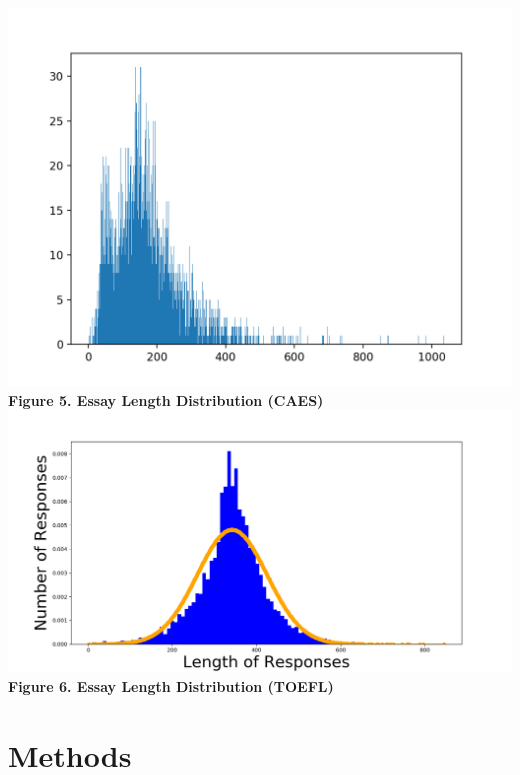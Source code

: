 \documentclass[12pt]{article}
\begin{document}
 \begin{center}
 	\includegraphics[scale=0.8]{lengthD}\\
 	\textbf{Figure 5. Essay Length Distribution (CAES)}
 	\includegraphics[scale=0.4]{Figure1}\\
 	\textbf{Figure 6. Essay Length Distribution (TOEFL)}
 \end{center}

 \section{Methods}
\end{document}
